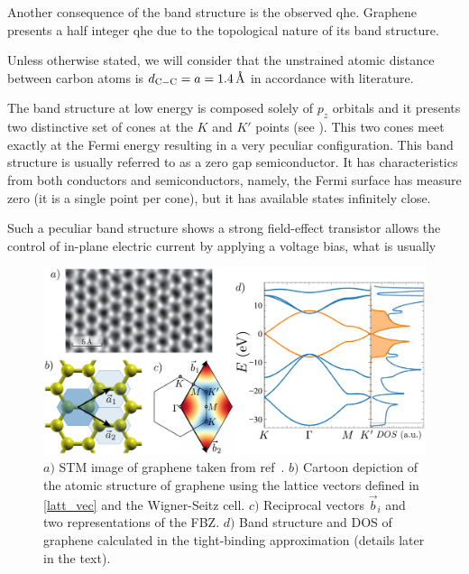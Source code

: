 Another consequence of the band structure is the observed \ac{qhe}\cite{Zheng2002,Zhang2005,Gusynin2005,Peres2006a,Brey2006,Fertig2007,Ostrovsky2008,Fujita2016}. Graphene presents a half integer \ac{qhe} due to the topological nature of its band structure.
\bigskip






Unless otherwise stated, we will consider that the unstrained atomic distance between carbon atoms is $d_{\ce{C}-\ce{C}}=a=\SI{1.4}{\angstrom}$ in accordance with literature\cite{KatsnelsonBook, Cooper2012, Ishigami2007}. %

The band structure at low energy is composed solely of $p_z$ orbitals and it presents two distinctive set of cones at the $K$ and $K'$ points (see ). This two cones meet exactly at the Fermi energy resulting in a very peculiar configuration. This band structure is usually referred to as a zero gap semiconductor. It has characteristics from both conductors and semiconductors, namely, the Fermi surface has measure zero (it is a single point per cone), but it has available states infinitely close.

Such a peculiar band structure shows a strong field-effect transistor allows the control of in-plane electric current by applying a voltage bias, what is usually 

\begin{figure}[h!]
\centering
\includegraphics{graphene/figures/graphene_summary.pdf}
\vspace{-5pt}
\caption{$a)$ STM image of graphene taken from ref~\cite{Huang2011}. $b)$ Cartoon depiction of the atomic structure of graphene using the lattice vectors defined in \eqref{latt_vec} and the Wigner-Seitz cell. $c)$ Reciprocal vectors $\vec{b}_i$ and two representations of the FBZ. $d)$ Band structure and DOS of graphene calculated in the tight-binding approximation (details later in the text).}
\label{graphene_summary}
\end{figure}
\FloatBarrier

